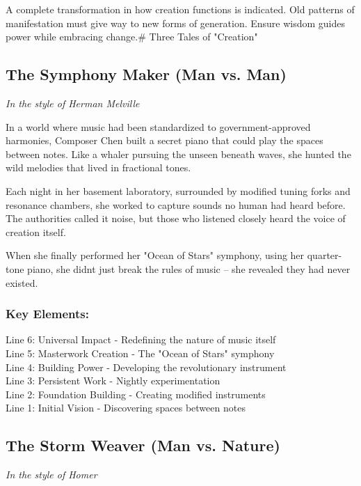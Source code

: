 \documentclass[
]{article}
\begin{document}
A complete transformation in how creation functions is indicated. Old
patterns of manifestation must give way to new forms of generation.
Ensure wisdom guides power while embracing change.\# Three Tales of
"Creation"

\subsection{The Symphony Maker (Man vs.
Man)}\label{the-symphony-maker-man-vs-man}

\emph{In the style of Herman Melville}

In a world where music had been standardized to government-approved
harmonies, Composer Chen built a secret piano that could play the spaces
between notes. Like a whaler pursuing the unseen beneath waves, she
hunted the wild melodies that lived in fractional tones.

Each night in her basement laboratory, surrounded by modified tuning
forks and resonance chambers, she worked to capture sounds no human had
heard before. The authorities called it noise, but those who listened
closely heard the voice of creation itself.

When she finally performed her "Ocean of Stars" symphony, using her
quarter-tone piano, she didn\textquotesingle t just break the rules of
music -- she revealed they had never existed.

\subsubsection{Key Elements:}\label{key-elements}

Line 6: Universal Impact - Redefining the nature of music itself\\
Line 5: Masterwork Creation - The "Ocean of Stars" symphony\\
Line 4: Building Power - Developing the revolutionary instrument\\
Line 3: Persistent Work - Nightly experimentation\\
Line 2: Foundation Building - Creating modified instruments\\
Line 1: Initial Vision - Discovering spaces between notes

\subsection{The Storm Weaver (Man vs.
Nature)}\label{the-storm-weaver-man-vs-nature}

\emph{In the style of Homer}
\end{document}
